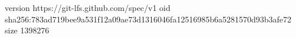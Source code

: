 version https://git-lfs.github.com/spec/v1
oid sha256:783ad719bee9a531f12a09ae73d1316046fa12516985b6a5281570d93b3afe72
size 1398276
